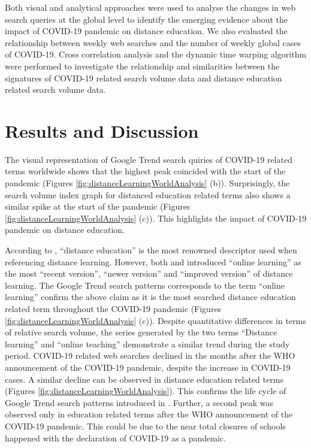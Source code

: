 \documentclass[11pt,a4paper,]{article}
\begin{document}
Both visual and analytical approaches were used to analyse the changes in web search queries at the global level to identify the emerging evidence about the impact of COVID-19 pandemic on distance education. We also evaluated the relationship between weekly web searches and the number of weekly global cases of COVID-19. Cross correlation analysis and the dynamic time warping algorithm \autocite{giorgino2009computing} were performed to investigate the relationship and similarities between the signatures of COVID-19 related search volume data and distance education related search volume data.

\hypertarget{results-and-discussion}{%
\section{Results and Discussion}\label{results-and-discussion}}

The visual representation of Google Trend search quiries of COVID-19 related terms worldwide shows that the highest peak coincided with the start of the pandemic (Figures \ref{fig:distanceLearningWorldAnalysis} (b)). Surprisingly, the search volume index graph for distanced education related terms also shows a similar spike at the start of the pandemic (Figures \ref{fig:distanceLearningWorldAnalysis} (c)). This highlights the impact of COVID-19 pandemic on distance education.

According to \textcite{moore2011learning}, ``distance education'' is the most renowned descriptor used when referencing distance learning. However, both \textcite{benson2002usability} and \textcite{conrad2002deep} introduced ``online learning'' as the most ``recent version'', ``newer version'' and ``improved version'' of distance learning. The Google Trend search patterns corresponds to the term ``online learning'' confirm the above claim as it is the most searched distance education related term throughout the COVID-19 pandemic (Figures \ref{fig:distanceLearningWorldAnalysis} (c)). Despite quantitative differences in terms of relative search volume, the series generated by the two terms ``Distance learning'' and ``online teaching'' demonstrate a similar trend during the study period. COVID-19 related web searches declined in the months after the WHO announcement of the COVID-19 pandemic, despite the increase in COVID-19 cases. A similar decline can be observed in distance education related terms (Figures \ref{fig:distanceLearningWorldAnalysis}). This confirms the life cycle of Google Trend search patterns introduced in \textcite{jarynowski2020perception}. Further, a second peak was observed only in education related terms after the WHO announcement of the COVID-19 pandemic. This could be due to the near total closures of schools happened with the declaration of COVID-19 as a pandemic.
\end{document}
